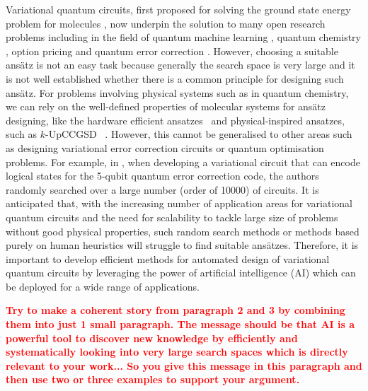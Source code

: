 \documentclass[a4paper,onecolumn,11pt]{quantumarticle}
\begin{document}
Variational quantum circuits, first proposed for solving the ground state energy problem for molecules \cite{peruzzo2014variational}, now underpin the solution to many open research problems including in the field of quantum machine learning \cite{schuldpetruccione2021}, quantum chemistry \cite{RevModPhys.92.015003}, option pricing \cite{2020optionpricing} and quantum error correction \cite{johnson2017qvector, Xu2021-dt}. However, choosing a suitable ans\"atz is not an easy task because generally the search space is very large and it is not well established whether there is a common principle for designing such ans\"atz. For problems involving physical systems such as in quantum chemistry, we can rely on the well-defined properties of molecular systems for ans\"atz designing, like the  hardware efficient ansatzes~\cite{2017hardwareefficientvqe} and physical-inspired ansatzes, such as $k$-UpCCGSD~ \cite{physicalinspiredansatze1doi:10.1021/acs.jctc.8b01004}. However, this cannot be generalised to other areas such as designing variational error correction circuits or quantum optimisation problems. For example, in \cite{Xu2021-dt}, when developing a variational circuit that can encode logical states for the 5-qubit quantum error correction code, the authors randomly searched over a large number (order of 10000) of circuits. It is anticipated that, with the increasing number of application areas for variational quantum circuits and the need for scalability to tackle large size of problems without good physical properties, such random search methods or methods based purely on human heuristics will struggle to find suitable ans\"atzes. Therefore, it is important to develop efficient methods for automated design of variational quantum circuits by leveraging the power of artificial intelligence (AI) which can be deployed for a wide range of applications.

\textcolor{red}{\textbf{Try to make a coherent story from paragraph 2 and 3 by combining them into just 1 small paragraph. The message should be that AI is a powerful tool to discover new knowledge by efficiently and systematically looking into very large search spaces which is directly relevant to your work... So you give this message in this paragraph and then use two or three examples to support your argument. }}
\end{document}
